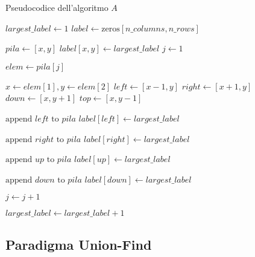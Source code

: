 \begin{algorithm}
    \caption{Pseudocodice dell'algoritmo $A$}
    \label{alg:standard}
    {\small
    \begin{algorithmic}[1]
    \State $largest\_label \gets 1$ 
    \State $label \gets \text{zeros}[n\_columns, n\_rows]$
    
            \State $pila \gets [x, y]$ 
            \State $label[x, y] \gets largest\_label$
            \State $j \gets 1$
            
                \State $elem \gets pila[j]$
                
                \State $x \gets elem[1], y \gets elem[2]$
                \State $left \gets [x - 1, y]$
                \State $right \gets [x + 1, y]$
                \State $down \gets [x, y+1]$
                \State $top \gets [x, y-1]$
                
                    \State $\text{append } left \text{ to } pila$
                    \State $label[left] \gets largest\_label$
                \EndIf
                
                    \State $\text{append } right \text{ to } pila$
                    \State $label[right] \gets largest\_label$
                \EndIf
                
                    \State $\text{append } up \text{ to } pila$
                    \State $label[up] \gets largest\_label$
                \EndIf
                
                    \State $\text{append } down \text{ to } pila$
                    \State $label[down] \gets largest\_label$
                \EndIf
                
                \State $j \gets j + 1$
            \EndWhile
            
            \State $largest\_label \gets largest\_label + 1$
        \EndIf
    \EndFor
    \end{algorithmic}
    }
\end{algorithm}

\subsection*{Paradigma Union-Find}

